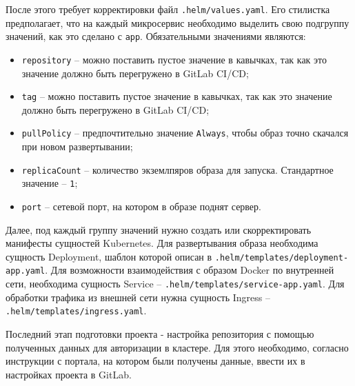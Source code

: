 После этого требует корректировки файл \texttt{.helm/values.yaml}. Его стилистка предполагает, что на каждый микросервис необходимо выделить свою подгруппу значений, как это сделано с \texttt{app}. Обязательными значениями являются:
\begin{itemize}
    \item \texttt{repository} -- можно поставить пустое значение в кавычках, так как это значение должно быть перегружено в GitLab CI/CD;
    \item \texttt{tag} -- можно поставить пустое значение в кавычках, так как это значение должно быть перегружено в GitLab CI/CD;
    \item \texttt{pullPolicy} -- предпочтительно значение \texttt{Always}, чтобы образ точно скачался при новом развертывании;
    \item \texttt{replicaCount} -- количество экземлпяров образа для запуска. Стандартное значение -- \texttt{1};
    \item \texttt{port} -- сетевой порт, на котором в образе поднят сервер.
\end{itemize}

Далее, под каждый группу значений нужно создать или скорректировать манифесты сущностей Kubernetes. Для развертывания образа необходима сущность Deployment, шаблон которой описан в \texttt{.helm/templates/deployment-app.yaml}. Для возможности взаимодействия с образом Docker по внутренней сети, необходима сущность Service -- \texttt{.helm/templates/service-app.yaml}. Для обработки трафика из внешней сети нужна сущность Ingress -- \texttt{.helm/templates/ingress.yaml}.

Последний этап подготовки проекта - настройка репозитория с помощью полученных данных для авторизации в кластере. Для этого необходимо, согласно инструкции с портала, на котором были получены данные, ввести их в настройках проекта в GitLab.
